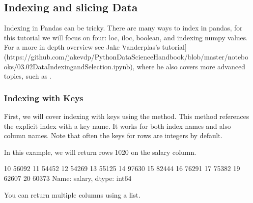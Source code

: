 \documentclass[letterpaper,10pt,english]{sphinxmanual}
\begin{document}
\subsection{Indexing and slicing Data}
\label{\detokenize{content/Introduction_to_Pandas:indexing-and-slicing-data}}
Indexing in Pandas can be tricky. There are many ways to index in pandas, for this tutorial we will focus on four: loc, iloc, boolean, and indexing numpy values. For a more in depth overview see Jake Vanderplas’s tutorial{]}(https://github.com/jakevdp/PythonDataScienceHandbook/blob/master/notebooks/03.02\sphinxhyphen{}Data\sphinxhyphen{}Indexing\sphinxhyphen{}and\sphinxhyphen{}Selection.ipynb), where he also covers more advanced topics, such as .


\subsubsection{Indexing with Keys}
\label{\detokenize{content/Introduction_to_Pandas:indexing-with-keys}}
First, we will cover indexing with keys using the  method. This method references the explicit index with a key name. It works for both index names and also column names. Note that often the keys for rows are integers by default.

In this example, we will return rows 10\sphinxhyphen{}20 on the salary column.

\begin{sphinxVerbatim}[commandchars=\\\{\}]
\PYG{p}{[} \PYG{p}{]}
\end{sphinxVerbatim}

\begin{sphinxVerbatim}[commandchars=\\\{\}]
10    56092
11    54452
12    54269
13    55125
14    97630
15    82444
16    76291
17    75382
19    62607
20    60373
Name: salary, dtype: int64
\end{sphinxVerbatim}

You can return multiple columns using a list.

\begin{sphinxVerbatim}[commandchars=\\\{\}]
\PYG{p}{[} \PYG{p}{[} \PYG{p}{]}\PYG{p}{]}
\end{sphinxVerbatim}
\end{document}
